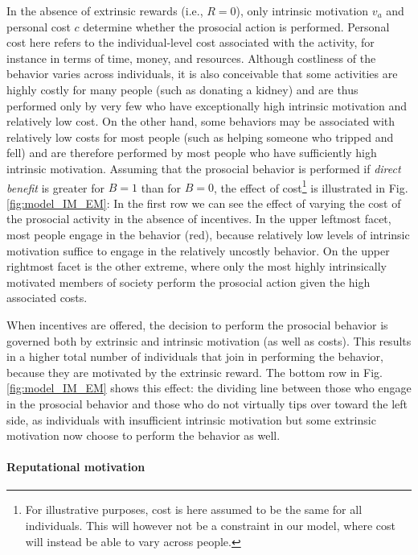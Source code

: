 \documentclass[AER]{AEA}
\begin{document}
In the absence of extrinsic rewards (i.e., $R = 0$), only intrinsic motivation $v_{a}$ and personal cost $c$ determine whether the prosocial action is performed. Personal cost here refers to the individual-level cost associated with the activity, for instance in terms of time, money, and resources. Although costliness of the behavior varies across individuals, it is also conceivable that some activities are highly costly for many people (such as donating a kidney) and are thus performed only by very few who have exceptionally high intrinsic motivation and relatively low cost. On the other hand, some behaviors may be associated with relatively low costs for most people (such as helping someone who tripped and fell) and are therefore performed by most people who have sufficiently high intrinsic motivation. Assuming that the prosocial behavior is performed if \textit{direct benefit} is greater for $B = 1$ than for $B = 0$, the effect of cost\footnote{For illustrative purposes, cost is here assumed to be the same for all individuals. This will however not be a constraint in our model, where cost will instead be able to vary across people.} is illustrated in Fig. \ref{fig:model_IM_EM}: In the first row we can see the effect of varying the cost of the prosocial activity in the absence of incentives. In the upper leftmost facet, most people engage in the behavior (red), because relatively low levels of intrinsic motivation suffice to engage in the relatively uncostly behavior. On the upper rightmost facet is the other extreme, where only the most highly intrinsically motivated members of society perform the prosocial action given the high associated costs.


When incentives are offered, the decision to perform the prosocial behavior is governed both by extrinsic and intrinsic motivation (as well as costs). This results in a higher total number of individuals that join in performing the behavior, because they are motivated by the extrinsic reward. The bottom row in Fig. \ref{fig:model_IM_EM} shows this effect: the dividing line between those who engage in the prosocial behavior and those who do not virtually tips over toward the left side, as individuals with insufficient intrinsic motivation but some extrinsic motivation now choose to perform the behavior as well. 

\paragraph{Reputational motivation}
\end{document}

